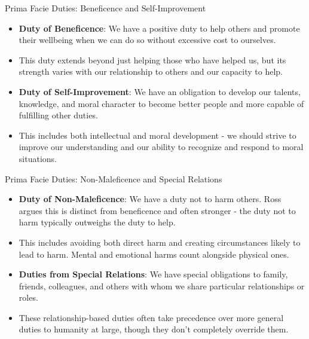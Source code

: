 \documentclass{beamer}
\begin{document}
\begin{frame}{Prima Facie Duties: Beneficence and Self-Improvement}
\begin{itemize}
    \item \textbf{Duty of Beneficence}: We have a positive duty to help others and promote their wellbeing when we can do so without excessive cost to ourselves.
    
    \item This duty extends beyond just helping those who have helped us, but its strength varies with our relationship to others and our capacity to help.
    
    \item \textbf{Duty of Self-Improvement}: We have an obligation to develop our talents, knowledge, and moral character to become better people and more capable of fulfilling other duties.
    
    \item This includes both intellectual and moral development - we should strive to improve our understanding and our ability to recognize and respond to moral situations.
\end{itemize}
\end{frame}

\begin{frame}{Prima Facie Duties: Non-Maleficence and Special Relations}
\begin{itemize}
    \item \textbf{Duty of Non-Maleficence}: We have a duty not to harm others. Ross argues this is distinct from beneficence and often stronger - the duty not to harm typically outweighs the duty to help.
    
    \item This includes avoiding both direct harm and creating circumstances likely to lead to harm. Mental and emotional harms count alongside physical ones.
    
    \item \textbf{Duties from Special Relations}: We have special obligations to family, friends, colleagues, and others with whom we share particular relationships or roles.
    
    \item These relationship-based duties often take precedence over more general duties to humanity at large, though they don't completely override them.
\end{itemize}
\end{frame}
\end{document}
